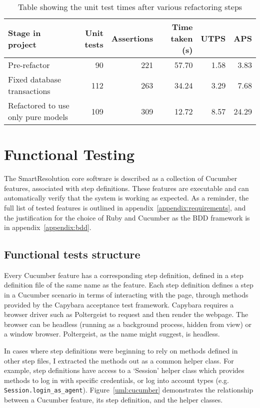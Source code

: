 \begin{table}[h!]
\label{table:testTimes}
\begin{center}
\begin{tabular}{ l | r | r | r | r | r}
  Stage in project & Unit tests & Assertions & Time taken (s) & UTPS & APS \\
  \hline
  Pre-refactor & 90 & 221 & 57.70 & 1.58 & 3.83\\
  Fixed database transactions & 112 & 263 & 34.24 & 3.29 & 7.68\\
  Refactored to use only pure models & 109 & 309 & 12.72 & 8.57 & 24.29
\end{tabular}
\end{center}
\caption {Table showing the unit test times after various refactoring steps}
\end{table}

\section{Functional Testing}

The SmartResolution core software is described as a collection of Cucumber features, associated with step definitions. These features are executable and can automatically verify that the system is working as expected. As a reminder, the full list of tested features is outlined in appendix~\ref{appendix:requirements}, and the justification for the choice of Ruby and Cucumber as the BDD framework is in appendix~\ref{appendix:bdd}.

\subsection{Functional tests structure}

Every Cucumber feature has a corresponding step definition, defined in a step definition file of the same name as the feature. Each step definition defines a step in a Cucumber scenario in terms of interacting with the page, through methods provided by the Capybara acceptance test framework. Capybara requires a browser driver such as Poltergeist to request and then render the webpage. The browser can be headless (running as a background process, hidden from view) or a window browser. Poltergeist, as the name might suggest, is headless.

In cases where step definitions were beginning to rely on methods defined in other step files, I extracted the methods out as a common helper class. For example, step definitions have access to a `Session' helper class which provides methods to log in with specific credentials, or log into account types (e.g. \lstinline{Session.login_as_agent}). Figure~\ref{uml:cucumber} demonstrates the relationship between a Cucumber feature, its step definition, and the helper classes.

